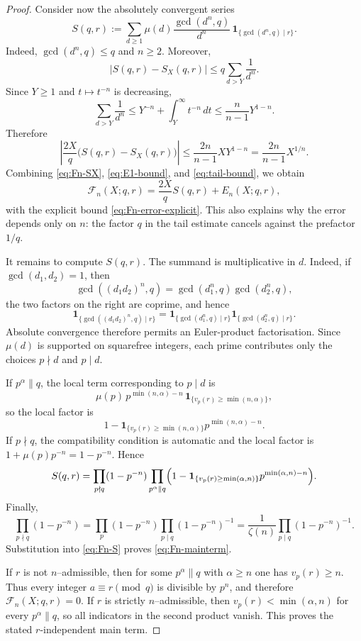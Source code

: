 \documentclass[10pt,a4paper]{amsart}
\begin{document}
\begin{proof}
Consider now the absolutely convergent series
\[
S(q,r):=
\sum_{d\ge1}
\mu(d)\frac{\gcd(d^n,q)}{d^n}\,
\mathbf 1_{\{\gcd(d^n,q)\mid r\}}.
\]
Indeed, $\gcd(d^n,q)\le q$ and $n\ge2$. Moreover,
\[
|S(q,r)-S_X(q,r)|
\le q\sum_{d>Y}\frac1{d^n}.
\]
Since $Y\ge1$ and $t\mapsto t^{-n}$ is decreasing,
\[
\sum_{d>Y}\frac1{d^n}
\le Y^{-n}+\int_Y^\infty t^{-n}\,dt
\le \frac{n}{n-1}Y^{1-n}.
\]
Therefore
\begin{equation}\label{eq:tail-bound}
\left|\frac{2X}{q}\bigl(S(q,r)-S_X(q,r)\bigr)\right|
\le\frac{2n}{n-1}XY^{1-n}
=\frac{2n}{n-1}X^{1/n}.
\end{equation}
Combining \eqref{eq:Fn-SX}, \eqref{eq:E1-bound}, and \eqref{eq:tail-bound}, we obtain
\begin{equation}\label{eq:Fn-S}
\mathcal F_n(X;q,r)=\frac{2X}{q}S(q,r)+E_n(X;q,r),
\end{equation}
with the explicit bound \eqref{eq:Fn-error-explicit}. This also explains why the error depends
only on $n$: the factor $q$ in the tail estimate cancels against the prefactor $1/q$.

It remains to compute $S(q,r)$. The summand is multiplicative in $d$. Indeed, if
$\gcd(d_1,d_2)=1$, then
\[
\gcd((d_1d_2)^n,q)=\gcd(d_1^n,q)\gcd(d_2^n,q),
\]
the two factors on the right are coprime, and hence
\[
\mathbf 1_{\{\gcd((d_1d_2)^n,q)\mid r\}}
=
\mathbf 1_{\{\gcd(d_1^n,q)\mid r\}}
\mathbf 1_{\{\gcd(d_2^n,q)\mid r\}}.
\]
Absolute convergence therefore permits an Euler-product factorisation. Since $\mu(d)$ is
supported on squarefree integers, each prime contributes only the choices $p\nmid d$ and
$p\mid d$.

If $p^\alpha\parallel q$, the local term corresponding to $p\mid d$ is
\[
\mu(p)\,p^{\min(n,\alpha)-n}\,
\mathbf 1_{\{v_p(r)\ge\min(n,\alpha)\}},
\]
so the local factor is
\[
1-
\mathbf 1_{\{v_p(r)\ge\min(n,\alpha)\}}
 p^{\min(n,\alpha)-n}.
\]
If $p\nmid q$, the compatibility condition is automatic and the local factor is
$1+\mu(p)p^{-n}=1-p^{-n}$. Hence
\[
S(q,r)=
\prod_{p\nmid q}(1-p^{-n})
\prod_{p^\alpha\parallel q}
\Bigl(1-
\mathbf 1_{\{v_p(r)\ge\min(\alpha,n)\}}
 p^{\min(\alpha,n)-n}\Bigr).
\]
Finally,
\[
\prod_{p\nmid q}(1-p^{-n})
=
\prod_p(1-p^{-n})\prod_{p\mid q}(1-p^{-n})^{-1}
=
\frac1{\zeta(n)}\prod_{p\mid q}(1-p^{-n})^{-1}.
\]
Substitution into \eqref{eq:Fn-S} proves \eqref{eq:Fn-mainterm}.

If $r$ is not $n$--admissible, then for some $p^\alpha\parallel q$ with $\alpha\ge n$ one has
$v_p(r)\ge n$. Thus every integer $a\equiv r\pmod q$ is divisible by $p^n$, and therefore
$\mathcal F_n(X;q,r)=0$. If $r$ is strictly $n$--admissible, then
$v_p(r)<\min(\alpha,n)$ for every $p^\alpha\parallel q$, so all indicators in the second
product vanish. This proves the stated $r$-independent main term.
\end{proof}
\end{document}
